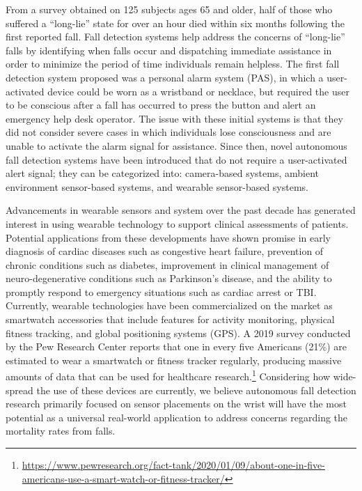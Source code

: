 \documentclass{llncs}
\begin{document}
	From a survey obtained on 125 subjects ages 65 and older, half of those who suffered a ``long-lie'' state for over an hour died within six months following the first reported fall.\cite{wild1981dangerous} Fall detection systems help address the concerns of ``long-lie'' falls by identifying when falls occur and dispatching immediate assistance in order to minimize the period of time individuals remain helpless. The first fall detection system proposed was a personal alarm system (PAS), in which a user-activated device could be worn as a wristband or necklace, but required the user to be conscious after a fall has occurred to press the button and alert an emergency help desk operator.\cite{de2015towards} The issue with these initial systems is that they did not consider severe cases in which individuals lose consciousness and are unable to activate the alarm signal for assistance. Since then, novel autonomous fall detection systems have been introduced that do not require a user-activated alert signal; they can be categorized into: camera-based systems, ambient environment sensor-based systems, and wearable sensor-based systems. 	
	
	Advancements in wearable sensors and system over the past decade has generated interest in using wearable technology to support clinical assessments of patients. Potential applications from these developments have shown promise in early diagnosis of cardiac diseases such as congestive heart failure, prevention of chronic conditions such as diabetes, improvement in clinical management of neuro-degenerative conditions such as Parkinson's disease, and the ability to promptly respond to emergency situations such as cardiac arrest or TBI.\cite{bonato2010wearable} Currently, wearable technologies have been commercialized on the market as smartwatch accessories that include features for activity monitoring, physical fitness tracking, and global positioning systems (GPS). A 2019 survey conducted by the Pew Research Center reports that one in every five Americans (21\%) are estimated to wear a smartwatch or fitness tracker regularly, producing massive amounts of data that can be used for healthcare research.\footnote{\url{https://www.pewresearch.org/fact-tank/2020/01/09/about-one-in-five-americans-use-a-smart-watch-or-fitness-tracker/}} Considering how wide-spread the use of these devices are currently, we believe autonomous fall detection research primarily focused on sensor placements on the wrist will have the most potential as a universal real-world application to address concerns regarding the mortality rates from falls.
	
\end{document}
